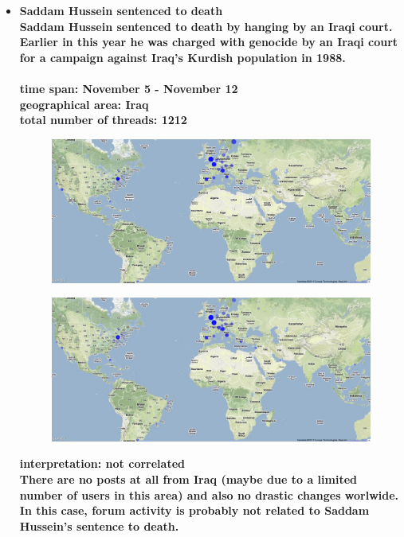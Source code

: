 \documentclass[11pt,a4paper,english]{article}
\begin{document}
\begin{itemize}
					\item \bf Saddam Hussein sentenced to death \rm
						\\ Saddam Hussein sentenced to death by hanging by an Iraqi court. Earlier in this year he was charged with genocide by an Iraqi court for a campaign against Iraq's Kurdish population in 1988.
					\\\\ \bf time span: \rm November 5 - November 12
						\\ \bf geographical area: \rm Iraq
						\\ \bf total number of threads: \rm 1212
						\begin{figure}[H]
							\vspace{-5pt}
  							\begin{center}
								\includegraphics[width=130mm]{img/pre-saddam}
							\end{center}
							\vspace{-13pt}
						\end{figure}
						\begin{figure}[H]
							\vspace{-13pt}
  							\begin{center}
								\includegraphics[width=130mm]{img/post-saddam}
							\end{center}
							\vspace{-5pt}
						\end{figure}	
						
					\bf interpretation: \rm not correlated
					\\ There are no posts at all from Iraq (maybe due to a limited number of users in this area) and also no drastic changes worlwide. In this case, forum activity is probably not related to Saddam Hussein's sentence to death.						
							
				\end{itemize}
			
\end{document}
